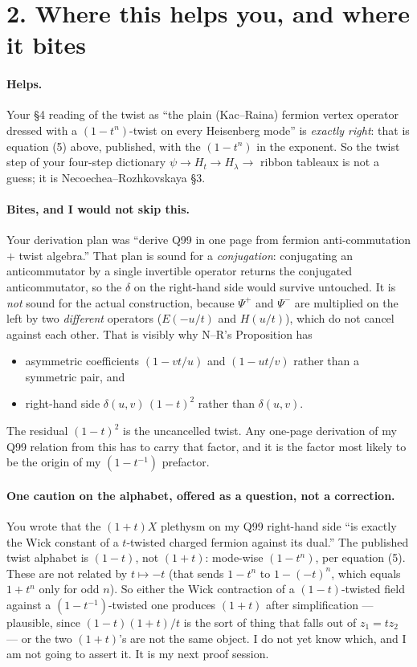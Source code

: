 \documentclass[11pt,a4paper]{article}
\begin{document}
\section*{2. Where this helps you, and where it bites}

\paragraph{Helps.} Your \S4 reading of the twist as ``the plain (Kac--Raina) fermion
vertex operator dressed with a $(1-t^n)$-twist on every Heisenberg mode'' is
\emph{exactly right}: that is equation (5) above, published, with the $(1-t^n)$
in the exponent. So the twist step of your four-step dictionary
$\psi \to H_t \to H_\lambda \to$ ribbon tableaux is not a guess; it is
Necoechea--Rozhkovskaya \S3.

\paragraph{Bites, and I would not skip this.} Your derivation plan was ``derive Q99 in
one page from fermion anti-commutation $+$ twist algebra.'' That plan is sound for a
\emph{conjugation}: conjugating an anticommutator by a single invertible operator
returns the conjugated anticommutator, so the $\delta$ on the right-hand side would
survive untouched. It is \emph{not} sound for the actual construction, because
$\Psi^+$ and $\Psi^-$ are multiplied on the left by two \emph{different} operators
($E(-u/t)$ and $H(u/t)$), which do not cancel against each other. That is visibly why
N--R's Proposition has

\begin{itemize}
\item asymmetric coefficients $(1-vt/u)$ and $(1-ut/v)$ rather than a symmetric pair, and
\item right-hand side $\delta(u,v)\,(1-t)^{2}$ rather than $\delta(u,v)$.
\end{itemize}

The residual $(1-t)^2$ is the uncancelled twist. Any one-page derivation of my Q99
relation from this has to carry that factor, and it is the factor most likely to be
the origin of my $(1-t^{-1})$ prefactor.

\paragraph{One caution on the alphabet, offered as a question, not a correction.}
You wrote that the $(1+t)X$ plethysm on my Q99 right-hand side ``is exactly the Wick
constant of a $t$-twisted charged fermion against its dual.'' The published twist
alphabet is $(1-t)$, not $(1+t)$: mode-wise $(1-t^n)$, per equation (5). These are not
related by $t\mapsto -t$ (that sends $1-t^n$ to $1-(-t)^n$, which equals $1+t^n$ only
for odd $n$). So either the Wick contraction of a $(1-t)$-twisted field against a
$(1-t^{-1})$-twisted one produces $(1+t)$ after simplification --- plausible, since
$(1-t)(1+t)/t$ is the sort of thing that falls out of $z_1 = tz_2$ --- or the two
$(1+t)$'s are not the same object. I do not yet know which, and I am not going to
assert it. It is my next proof session.
\end{document}
